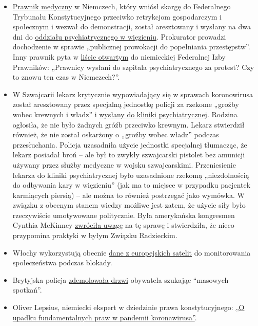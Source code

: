 \begin{itemize}
\tightlist
\item
  \href{http://beatebahner.de/}{Prawnik medyczny} w Niemczech, który
  wniósł skargę do Federalnego Trybunału Konstytucyjnego przeciwko
  retrykcjom gospodarczym i społecznym i wezwał do demonstracji, został
  aresztowany i wysłany na dwa dni do
  \href{https://www.rnz.de/nachrichten/heidelberg_artikel,-nach-aufruf-zu-corona-demo-heidelberger-anwaeltin-in-psychiatrischer-einrichtung-update-_arid,508747.html}{oddziału
  psychiatrycznego w więzieniu}. Prokurator prowadzi dochodzenie w
  sprawie „publicznej prowokacji do popełniania przestępstw''. Inny
  prawnik pyta w
  \href{https://www.nachrichtenspiegel.de/2020/04/14/brief-an-die-bundesrechtsanwaltskammer-in-causa-bahmer/}{liście
  otwartym} do niemieckiej Federalnej Izby Prawników: „Prawnicy wysłani
  do szpitala psychiatrycznego za protest? Czy to znowu ten czas w
  Niemczech?''.
\item
  W Szwajcarii lekarz krytycznie wypowiadający się w sprawach
  koronowirusa został aresztowany przez specjalną jednostkę policji za
  rzekome „groźby wobec krewnych i władz'' i
  \href{https://www.srf.ch/news/regional/aargau-solothurn/festnahme-von-corona-kritiker-verschwoerung-oder-normale-intervention-der-aargauer-behoerden}{wysłany
  do kliniki psychiatrycznej}. Rodzina ogłosiła, że nie było żadnych
  gróźb przeciwko krewnym. Lekarz stwierdził również, że nie został
  oskarżony o „groźby wobec władz'' podczas przesłuchania. Policja
  uzasadniła użycie jednostki specjalnej tłumacząc, że lekarz posiadał
  broń -- ale był to zwykły szwajcarski pistolet bez amunicji używany
  przez służby medyczne w wojsku szwajcarskimi. Przeniesienie lekarza do
  kliniki psychiatrycznej było uzasadnione rzekomą „niezdolnością do
  odbywania kary w więzieniu'' (jak ma to miejsce w przypadku pacjentek
  karmiących piersią) -- ale można to również postrzegać jako wymówka. W
  związku z obecnym stanem wiedzy możliwe jest zatem, że użycie siły
  było rzeczywiście umotywowane politycznie. Była amerykańska kongresmen
  Cynthia McKinney
  \href{https://twitter.com/cynthiamckinney/status/1250075810838581248}{zwróciła
  uwagę} na tę sprawę i stwierdziła, że nieco przypomina praktyki w
  byłym Związku Radzieckim.
\item
  Włochy wykorzystują obecnie
  \href{https://www.ansa.it/english/news/2020/04/06/coronavirus-italy-activates-satellite-to-monitor-nation-3_f2ffb30c-d550-42f5-82fc-ec1f82c5c625.html}{dane
  z europejskich satelit} do monitorowania społeczeństwa podczas
  blokady.
\item
  Brytyjska policja
  \href{https://twitter.com/BanTheBBC/status/1249598512427347969}{zdemolowała
  drzwi} obywatela szukając ``masowych spotkań''.
\item
  Oliver Lepsius, niemiecki ekspert w dziedzinie prawa konstytucyjnego:
  \href{https://verfassungsblog.de/vom-niedergang-grundrechtlicher-denkkategorien-in-der-corona-pandemie/}{„O
  upadku fundamentalnych praw w pandemii koronawirusa''}.
\end{itemize}

